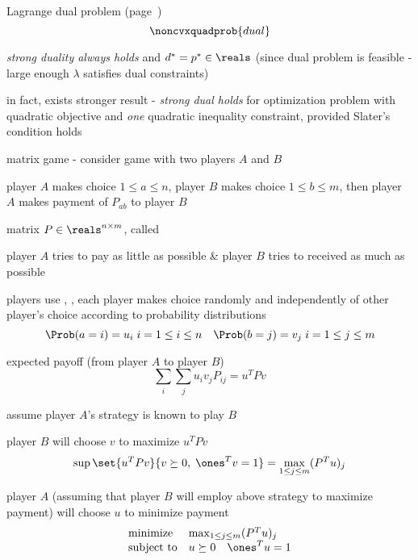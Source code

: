 \documentclass[17pt,landscape]{foils}
\begin{document}
{\vitem
	Lagrange dual problem (page~\pageref{page:dual problem of trust region nonconvex quadratic problems})
	$$
		\noncvxquadprob{dual}
	$$

\vitem
	\emph{strong duality always holds}
	and $d^\ast=p^\ast\in\reals$
	(since dual problem is feasible - large enough $\lambda$ satisfies dual constraints)

\vitem
	in fact, exists stronger result
	- \emph{strong dual holds} for optimization problem with quadratic objective
	and \emph{one} quadratic inequality constraint,
	provided Slater's condition holds
\eit


%

\bit
\item
	matrix game - consider game with two players $A$ and $B$
	\bit
	\item
		player $A$ makes choice $1\leq a\leq n$,
		player $B$ makes choice $1\leq b\leq m$,
		then player $A$ makes payment of $P_{ab}$ to player $B$
	\item
		matrix $P\in\reals^{n\times m}$, called 
	\item
		player $A$ tries to pay as little as possible
		\&
		player $B$ tries to received as much as possible
	\item
		players use ,
		\ie, each player makes choice randomly and independently of other player's choice
		according to probability distributions
		$$
			\Prob(a=i) = u_i\; i=1\leq i\leq n
			\quad
			\Prob(b=j) = v_j\; i=1\leq j\leq m
		$$

	\eit

\vitem
	expected payoff (from player $A$ to player $B$)
	$$
		\sum_i \sum_j u_iv_jP_{ij} = u^TPv
	$$

\vitem
	assume player $A$'s strategy is known to play $B$
	\bit
	\item
		player $B$ will choose $v$ to maximize $u^TPv$
		$$
			\sup\set{u^TPv}{v\succeq 0,\; \ones^Tv=1}
			= \max_{1\leq j\leq m} (P^Tu)_j
		$$
	\item
		player $A$ (assuming that player $B$ will employ above strategy to maximize payment)
		will choose $u$ to minimize payment
		$$
			\begin{array}{ll}
				\mbox{minimize} & \max_{1\leq j\leq m} (P^Tu)_j
				\\
				\mbox{subject to} &
					u\succeq 0\quad \ones^Tu=1
			\end{array}
		$$
	\eit

}
\end{document}

